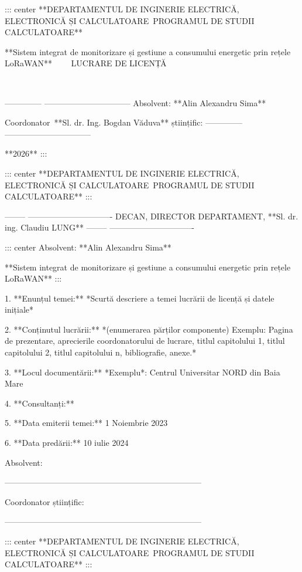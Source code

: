 ::: center
**DEPARTAMENTUL DE INGINERIE ELECTRICĂ, ELECTRONICĂ ȘI CALCULATOARE\
PROGRAMUL DE STUDII CALCULATOARE**

**Sistem integrat de monitorizare și gestiune a consumului energetic
prin rețele LoRaWAN**  \
 \
LUCRARE DE LICENȚĂ

 \

  -------------- --------------------------------
  Absolvent:     **Alin Alexandru Sima**

                 

  Coordonator\   **Sl. dr. Ing. Bogdan Văduva**
  științific:    
  -------------- --------------------------------

**2026**
:::

::: center
**DEPARTAMENTUL DE INGINERIE ELECTRICĂ, ELECTRONICĂ ȘI CALCULATOARE\
PROGRAMUL DE STUDII CALCULATOARE**
:::

  -------- -------------------------------
  DECAN,   DIRECTOR DEPARTAMENT,
           **Sl. dr. ing. Claudiu LUNG**
  -------- -------------------------------

::: center
Absolvent: **Alin Alexandru Sima**

**Sistem integrat de monitorizare și gestiune a consumului energetic
prin rețele LoRaWAN**
:::

1.  **Enunțul temei:** *Scurtă descriere a temei lucrării de licență și
    datele inițiale*

2.  **Conținutul lucrării:** *(enumerarea părților componente) Exemplu:
    Pagina de prezentare, aprecierile coordonatorului de lucrare, titlul
    capitolului 1, titlul capitolului 2, titlul capitolului n,
    bibliografie, anexe.*

3.  **Locul documentării:** *Exemplu*: Centrul Universitar NORD din Baia
    Mare

4.  **Consultanți:**

5.  **Data emiterii temei:** 1 Noiembrie 2023

6.  **Data predării:** 10 iulie 2024

Absolvent:

------------------------------------------------------------------------

Coordonator științific:

------------------------------------------------------------------------

::: center
**DEPARTAMENTUL DE INGINERIE ELECTRICĂ, ELECTRONICĂ ȘI CALCULATOARE\
PROGRAMUL DE STUDII CALCULATOARE**
:::

